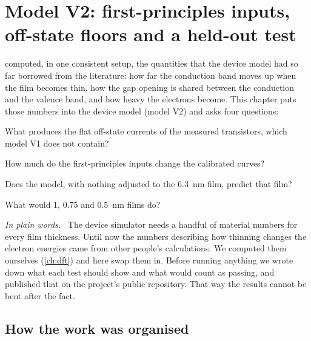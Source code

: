\newenvironment{v2plain}{\par\medskip\noindent\textit{In plain words.}\ }{\par\medskip}

\chapter{Model V2: first-principles inputs, off-state floors and a held-out test}
\label{ch:v2}

 computed, in one consistent setup, the quantities that the device model had so far borrowed from the
literature: how far the conduction band moves up when the film becomes thin, how the gap opening is shared between the
conduction and the valence band, and how heavy the electrons become. This chapter puts those numbers into the device
model (model V2) and asks four questions:
\begin{description}[leftmargin=1.2em]
\item[V1] What produces the flat off-state currents of the measured transistors, which model V1 does not contain?
\item[V2] How much do the first-principles inputs change the calibrated curves?
\item[V3] Does the model, with nothing adjusted to the 6.3~nm film, predict that film?
\item[V4] What would 1, 0.75 and 0.5~nm films do?
\end{description}

\begin{v2plain}
The device simulator needs a handful of material numbers for every film thickness. Until now the numbers describing
how thinning changes the electron energies came from other people's calculations. We computed them ourselves
(\cref{ch:dft}) and here swap them in. Before running anything we wrote down what each test should show and what
would count as passing, and published that on the project's public repository. That way the results cannot be
bent after the fact.
\end{v2plain}

\section{How the work was organised}
\label{sec:v2-method}

